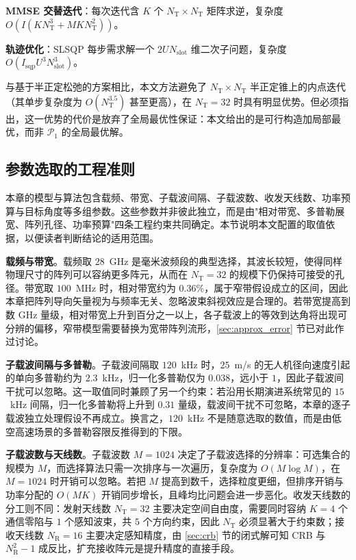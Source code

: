 \textbf{MMSE 交替迭代}：每次迭代含 $K$ 个 $N_{\mathrm{T}}\times N_{\mathrm{T}}$ 矩阵求逆，复杂度 $O(I(KN_{\mathrm{T}}^{3}+MKN_{\mathrm{T}}^{2}))$。

\textbf{轨迹优化}：SLSQP 每步需求解一个 $2UN_{\mathrm{slot}}$ 维二次子问题，复杂度 $O(I_{\mathrm{sqp}}U^{3}N_{\mathrm{slot}}^{3})$。

与基于半正定松弛的方案相比，本文方法避免了 $N_{\mathrm{T}}\times N_{\mathrm{T}}$ 半正定锥上的内点迭代（其单步复杂度为 $O(N_{\mathrm{T}}^{3.5})$ 甚至更高），在 $N_{\mathrm{T}}=32$ 时具有明显优势。但必须指出，这一优势的代价是放弃了全局最优性保证：本文给出的是可行构造加局部最优，而非 $\mathcal{P}_{1}$ 的全局最优解。

\subsection{参数选取的工程准则}
\label{sec:param_guide}

本章的模型与算法包含载频、带宽、子载波间隔、子载波数、收发天线数、功率预算与目标角度等多组参数。这些参数并非彼此独立，而是由"相对带宽、多普勒展宽、阵列孔径、功率预算"四条工程约束共同确定。本节说明本文配置的取值依据，以便读者判断结论的适用范围。

\textbf{载频与带宽}。载频取 $28$~GHz 是毫米波频段的典型选择，其波长较短，使得同样物理尺寸的阵列可以容纳更多阵元，从而在 $N_{\mathrm{T}}=32$ 的规模下仍保持可接受的孔径。带宽取 $100$~MHz 时，相对带宽约为 $0.36\%$，属于窄带假设成立的区间，因此本章把阵列导向矢量视为与频率无关、忽略波束斜视效应是合理的。若带宽提高到数 GHz 量级，相对带宽上升到百分之一以上，各子载波上的等效到达角将出现可分辨的偏移，窄带模型需要替换为宽带阵列流形，\ref{sec:approx_error} 节已对此作过讨论。

\textbf{子载波间隔与多普勒}。子载波间隔取 $120$~kHz 时，$25$~m/s 的无人机径向速度引起的单向多普勒约为 $2.3$~kHz，归一化多普勒仅为 $0.038$，远小于 $1$，因此子载波间干扰可以忽略。这一取值同时兼顾了另一个约束：若沿用长期演进系统常见的 $15$~kHz 间隔，归一化多普勒将上升到 $0.31$ 量级，载波间干扰不可忽略，本章的逐子载波独立处理假设不再成立。换言之，$120$~kHz 不是随意选取的数值，而是由低空高速场景的多普勒容限反推得到的下限。

\textbf{子载波数与天线数}。子载波数 $M=1024$ 决定了子载波选择的分辨率：可选集合的规模为 $M$，而选择算法只需一次排序与一次遍历，复杂度为 $O(M\log M)$，在 $M=1024$ 时开销可以忽略。若把 $M$ 提高到数千，选择粒度更细，但排序开销与功率分配的 $O(MK)$ 开销同步增长，且峰均比问题会进一步恶化。收发天线数的分工则不同：发射天线数 $N_{\mathrm{T}}=32$ 主要决定空间自由度，需要同时容纳 $K=4$ 个通信零陷与 $1$ 个感知波束，共 $5$ 个方向约束，因此 $N_{\mathrm{T}}$ 必须显著大于约束数；接收天线数 $N_{\mathrm{R}}=16$ 主要决定感知精度，由 \ref{sec:crb} 节的闭式解可知 CRB 与 $N_{\mathrm{R}}^{2}-1$ 成反比，扩充接收阵元是提升精度的直接手段。

